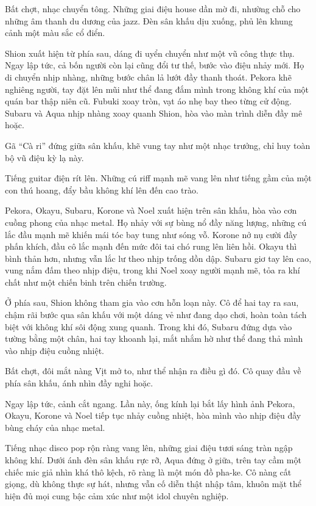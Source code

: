 \documentclass[../main.tex]{subfiles}
\begin{document}
Bất chợt, nhạc chuyển tông. Những giai điệu house dần mờ đi, nhường chỗ cho những âm thanh du dương của jazz. Đèn sân khấu dịu xuống, phủ lên khung cảnh một màu sắc cổ điển.

Shion xuất hiện từ phía sau, dáng đi uyển chuyển như một vũ công thực thụ. Ngay lập tức, cả bốn người còn lại cũng đổi tư thế, bước vào điệu nhảy mới. Họ di chuyển nhịp nhàng, những bước chân lả lướt đầy thanh thoát. Pekora khẽ nghiêng người, tay đặt lên mũi như thể đang đắm mình trong không khí của một quán bar thập niên cũ. Fubuki xoay tròn, vạt áo nhẹ bay theo từng cử động. Subaru và Aqua nhịp nhàng xoay quanh Shion, hòa vào màn trình diễn đầy mê hoặc.

Gã ``Cà ri'' đứng giữa sân khấu, khẽ vung tay như một nhạc trưởng, chỉ huy toàn bộ vũ điệu kỳ lạ này.

\ct


Tiếng guitar điện rít lên. Những cú riff mạnh mẽ vang lên như tiếng gầm của một con thú hoang, đẩy bầu không khí lên đến cao trào.

Pekora, Okayu, Subaru, Korone và Noel xuất hiện trên sân khấu, hòa vào cơn cuồng phong của nhạc metal. Họ nhảy với sự bùng nổ đầy năng lượng, những cú lắc đầu mạnh mẽ khiến mái tóc bay tung như sóng vỗ. Korone nở nụ cười đầy phấn khích, đầu cô lắc mạnh đến mức đôi tai chó rung lên liên hồi. Okayu thì bình thản hơn, nhưng vẫn lắc lư theo nhịp trống dồn dập. Subaru giơ tay lên cao, vung nắm đấm theo nhịp điệu, trong khi Noel xoay người mạnh mẽ, tỏa ra khí chất như một chiến binh trên chiến trường.

Ở phía sau, Shion không tham gia vào cơn hỗn loạn này. Cô để hai tay ra sau, chậm rãi bước qua sân khấu với một dáng vẻ như đang dạo chơi, hoàn toàn tách biệt với không khí sôi động xung quanh. Trong khi đó, Subaru đứng dựa vào tường bằng một chân, hai tay khoanh lại, mắt nhắm hờ như thể đang thả mình vào nhịp điệu cuồng nhiệt.

Bất chợt, đôi mắt nàng Vịt mở to, như thể nhận ra điều gì đó. Cô quay đầu về phía sân khấu, ánh nhìn đầy nghi hoặc.

Ngay lập tức, cảnh cắt ngang. Lần này, ống kính lại bắt lấy hình ảnh Pekora, Okayu, Korone và Noel tiếp tục nhảy cuồng nhiệt, hòa mình vào nhịp điệu đầy bùng cháy của nhạc metal.

\ct


Tiếng nhạc disco pop rộn ràng vang lên, những giai điệu tươi sáng tràn ngập không khí. Dưới ánh đèn sân khấu rực rỡ, Aqua đứng ở giữa, trên tay cầm một chiếc mic giả nhìn khá thô kệch, rõ ràng là một món đồ pha-ke. Cô nàng cất giọng, dù không thực sự hát, nhưng vẫn cố diễn thật nhập tâm, khuôn mặt thể hiện đủ mọi cung bậc cảm xúc như một idol chuyên nghiệp.
\end{document}
